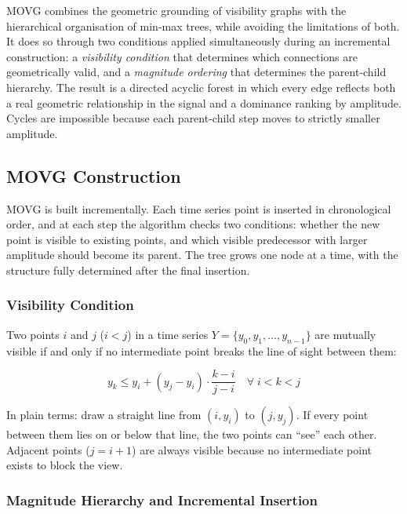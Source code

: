 \documentclass[a4paper,12pt]{article}
\begin{document}
MOVG combines the geometric grounding of visibility graphs with the hierarchical organisation of min-max trees, while avoiding the limitations of both. It does so through two conditions applied simultaneously during an incremental construction: a \emph{visibility condition} that determines which connections are geometrically valid, and a \emph{magnitude ordering} that determines the parent-child hierarchy. The result is a directed acyclic forest in which every edge reflects both a real geometric relationship in the signal and a dominance ranking by amplitude. Cycles are impossible because each parent-child step moves to strictly smaller amplitude.

\subsection{MOVG Construction}
\label{sec:movg-construction}

MOVG is built incrementally. Each time series point is inserted in chronological order, and at each step the algorithm checks two conditions: whether the new point is visible to existing points, and which visible predecessor with larger amplitude should become its parent. The tree grows one node at a time, with the structure fully determined after the final insertion.

\subsubsection{Visibility Condition}

Two points $i$ and $j$ ($i < j$) in a time series $Y = \{y_0, y_1, \ldots, y_{n-1}\}$ are mutually visible if and only if no intermediate point breaks the line of sight between them:

\begin{equation}
y_k \leq y_i + (y_j - y_i) \cdot \frac{k - i}{j - i} \quad \forall\; i < k < j
\label{eq:visibility}
\end{equation}

In plain terms: draw a straight line from $(i, y_i)$ to $(j, y_j)$. If every point between them lies on or below that line, the two points can ``see'' each other. Adjacent points ($j = i+1$) are always visible because no intermediate point exists to block the view.

\subsubsection{Magnitude Hierarchy and Incremental Insertion}
\end{document}
